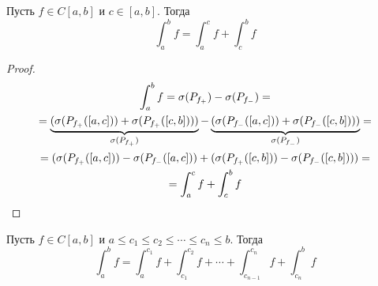 \begin{theorem}
    Пусть $f \in C[a, b]$ и $c \in [a, b]$. Тогда
    \begin{equation*}
        \int_{a}^{b} f = \int_{a}^{c} f + \int_{c}^{b} f
    \end{equation*}
\end{theorem}
\begin{proof}
    \begin{equation*}
        \begin{gathered}
             \int_{a}^{b} f = \sigma(P_{f_{+}}) - \sigma(P_{f_{-}})
             = \\ =
             \underbrace{(\sigma(P_{f_{+}}([a, c])) +
             \sigma(P_{f_{+}}([c, b])))}_{\mathclap{\sigma(P_{f_{+}})}} -
             \underbrace{(\sigma(P_{f_{-}}([a, c])) +
             \sigma(P_{f_{-}}([c, b])))}_{\mathclap{\sigma(P_{f_{-}})}}
             = \\ =
             (\sigma(P_{f_{+}}([a, c])) -
             \sigma(P_{f_{-}}([a, c])) +
             (\sigma(P_{f_{+}}([c, b])) -
             \sigma(P_{f_{-}}([c, b])))
             = \\ =
             \int_{a}^{c} f + \int_{c}^{b} f
         \end{gathered}
    \end{equation*}
\end{proof}

\begin{follow}
    Пусть $f \in C[a, b]$ и $a \leq c_1 \leq c_2 \leq \dotsb \leq c_n \leq b$. Тогда
    \begin{equation*}
    \int_{a}^{b} f =
    \int_{a}^{c_1} f +
    \int_{c_1}^{c_2} f +
    \dotsb +
    \int_{c_{n - 1}}^{c_n} f +
    \int_{c_n}^{b} f
    \end{equation*}
\end{follow}

